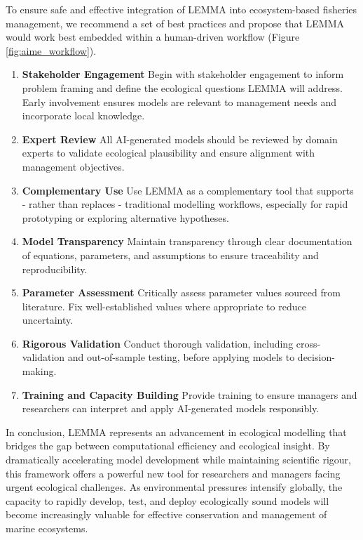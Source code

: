 To ensure safe and effective integration of LEMMA into ecosystem-based fisheries management, we recommend a set of best practices and propose that LEMMA would work best embedded within a human-driven workflow (Figure \ref{fig:aime_workflow}). 

\begin{enumerate}
    \item \textbf{Stakeholder Engagement}  
    Begin with stakeholder engagement to inform problem framing and define the ecological questions LEMMA will address. Early involvement ensures models are relevant to management needs and incorporate local knowledge.

    \item \textbf{Expert Review}  
    All AI-generated models should be reviewed by domain experts to validate ecological plausibility and ensure alignment with management objectives.

    \item \textbf{Complementary Use}  
    Use LEMMA as a complementary tool that supports - rather than replaces - traditional modelling workflows, especially for rapid prototyping or exploring alternative hypotheses.

    \item \textbf{Model Transparency}  
    Maintain transparency through clear documentation of equations, parameters, and assumptions to ensure traceability and reproducibility.

    \item \textbf{Parameter Assessment}  
    Critically assess parameter values sourced from literature. Fix well-established values where appropriate to reduce uncertainty.

    \item \textbf{Rigorous Validation}  
    Conduct thorough validation, including cross-validation and out-of-sample testing, before applying models to decision-making.

    \item \textbf{Training and Capacity Building}  
    Provide training to ensure managers and researchers can interpret and apply AI-generated models responsibly.
\end{enumerate}

In conclusion, LEMMA represents an advancement in ecological modelling that bridges the gap between computational efficiency and ecological insight. By dramatically accelerating model development while maintaining scientific rigour, this framework offers a powerful new tool for researchers and managers facing urgent ecological challenges. As environmental pressures intensify globally, the capacity to rapidly develop, test, and deploy ecologically sound models will become increasingly valuable for effective conservation and management of marine ecosystems.

